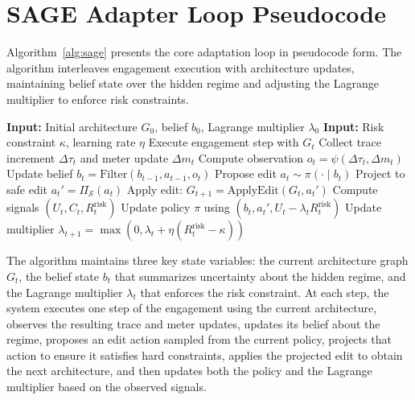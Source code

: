 \documentclass[sigconf,anonymous]{acmart}
\newcommand{\SAGE}{\textsc{Sage}\xspace}
\newcommand{\algref}[1]{Algorithm~\ref{#1}}
\begin{document}
\section{SAGE Adapter Loop Pseudocode}
\label{app:pseudocode}

\algref{alg:sage} presents the core adaptation loop in pseudocode form. The algorithm interleaves engagement execution with architecture updates, maintaining belief state over the hidden regime and adjusting the Lagrange multiplier to enforce risk constraints.

\begin{algorithm}[t]
\caption{\SAGE Adapter Loop}
\label{alg:sage}
\begin{algorithmic}[1]
\STATE \textbf{Input:} Initial architecture $G_0$, belief $b_0$, Lagrange multiplier $\lambda_0$
\STATE \textbf{Input:} Risk constraint $\kappa$, learning rate $\eta$
    \STATE Execute engagement step with $G_t$
    \STATE Collect trace increment $\Delta\tau_t$ and meter update $\Delta m_t$
    \STATE Compute observation $o_t = \psi(\Delta\tau_t, \Delta m_t)$
    \STATE Update belief $b_t = \text{Filter}(b_{t-1}, a_{t-1}, o_t)$
    \STATE Propose edit $a_t \sim \pi(\cdot \mid b_t)$
    \STATE Project to safe edit $a_t' = \Pi_{\mathcal{S}}(a_t)$
    \STATE Apply edit: $G_{t+1} = \text{ApplyEdit}(G_t, a_t')$
    \STATE Compute signals $(U_t, C_t, R_t^{\text{risk}})$
    \STATE Update policy $\pi$ using $(b_t, a_t', U_t - \lambda_t R_t^{\text{risk}})$
    \STATE Update multiplier $\lambda_{t+1} = \max(0, \lambda_t + \eta(R_t^{\text{risk}} - \kappa))$
\ENDFOR
\end{algorithmic}
\end{algorithm}

The algorithm maintains three key state variables: the current architecture graph $G_t$, the belief state $b_t$ that summarizes uncertainty about the hidden regime, and the Lagrange multiplier $\lambda_t$ that enforces the risk constraint. At each step, the system executes one step of the engagement using the current architecture, observes the resulting trace and meter updates, updates its belief about the regime, proposes an edit action sampled from the current policy, projects that action to ensure it satisfies hard constraints, applies the projected edit to obtain the next architecture, and then updates both the policy and the Lagrange multiplier based on the observed signals.
\end{document}
